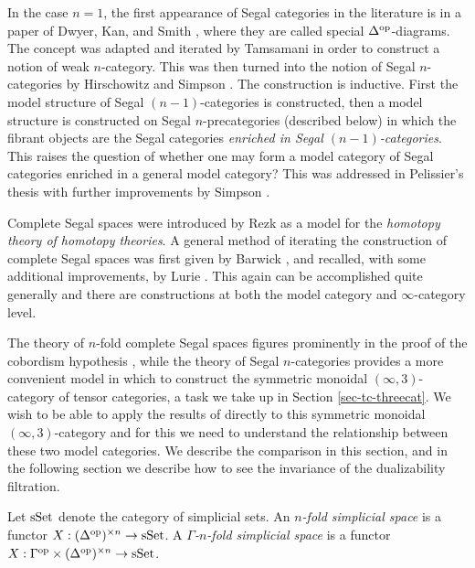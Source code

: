 \documentclass[a4paper]{amsart}
\begin{document}
In the case $n=1$, the first appearance of Segal categories in the literature is in a paper of Dwyer, Kan, and Smith \cite{MR984042}, where they are called special $\Delta^{\mathrm{op}}$-diagrams. The concept was adapted and iterated by Tamsamani \cite{Tamsamani:thesis} in order to construct a notion of weak $n$-category. This was then turned into the notion of Segal $n$-categories by Hirschowitz and Simpson \cite{9807049}. The construction is inductive.  First the model structure of Segal $(n-1)$-categories is constructed, then a model structure is constructed on Segal $n$-precategories (described below) in which the fibrant objects are the Segal categories {\em enriched in Segal $(n-1)$-categories}. This raises the question of whether one may form a model category of Segal categories enriched in a general model category? This was addressed in Pelissier's thesis \cite{Pelissier:thesis} with further improvements by Simpson \cite{1001.4071}.  

Complete Segal spaces were introduced by Rezk \cite{MR1804411} as a model for the {\em homotopy theory of homotopy theories}.  A general method of iterating the construction of complete Segal spaces was first given by Barwick \cite{Barwick:thesis}, and recalled, with some additional improvements, by Lurie \cite{0905.0462, MR2555928}. This again can be accomplished quite generally and there are constructions at both the model category and $\infty$-category level. 

The theory of $n$-fold complete Segal spaces figures prominently in the proof of the cobordism hypothesis \cite{MR2555928}, while the theory of Segal $n$-categories provides a more convenient model in which to construct the symmetric monoidal $(\infty,3)$-category of tensor categories, a task we take up in Section \ref{sec-tc-threecat}. We wish to be able to apply the results of \cite{MR2555928} directly to this symmetric monoidal $(\infty,3)$-category and for this we need to understand the relationship between these two model categories. We describe the comparison in this section, and in the following section we describe how to see the invariance of the dualizability filtration.  

\begin{definition}
	Let $\mathrm{sSet}$ denote the category of simplicial sets. An {\em $n$-fold simplicial space} is a functor $X: (\Delta^\textrm{op})^{\times n} \to \mathrm{sSet}$. A {\em $\Gamma$-$n$-fold simplicial space} is a functor $X: \Gamma^\textrm{op} \times (\Delta^\textrm{op})^{\times n} \to \mathrm{sSet}$.
\end{definition}
\end{document}
